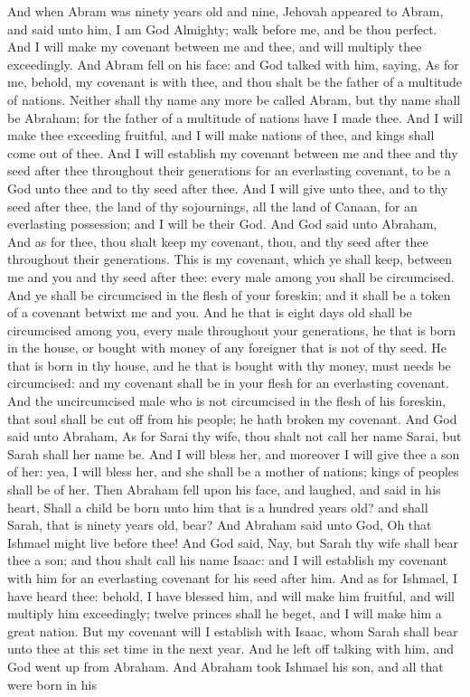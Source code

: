 And when Abram was ninety years old and nine, Jehovah appeared to Abram, and said unto him, I am God Almighty; walk before me, and be thou perfect. And I will make my covenant between me and thee, and will multiply thee exceedingly. And Abram fell on his face: and God talked with him, saying, As for me, behold, my covenant is with thee, and thou shalt be the father of a multitude of nations. Neither shall thy name any more be called Abram, but thy name shall be Abraham; for the father of a multitude of nations have I made thee. And I will make thee exceeding fruitful, and I will make nations of thee, and kings shall come out of thee. And I will establish my covenant between me and thee and thy seed after thee throughout their generations for an everlasting covenant, to be a God unto thee and to thy seed after thee. And I will give unto thee, and to thy seed after thee, the land of thy sojournings, all the land of Canaan, for an everlasting possession; and I will be their God.  And God said unto Abraham, And as for thee, thou shalt keep my covenant, thou, and thy seed after thee throughout their generations. This is my covenant, which ye shall keep, between me and you and thy seed after thee: every male among you shall be circumcised. And ye shall be circumcised in the flesh of your foreskin; and it shall be a token of a covenant betwixt me and you. And he that is eight days old shall be circumcised among you, every male throughout your generations, he that is born in the house, or bought with money of any foreigner that is not of thy seed. He that is born in thy house, and he that is bought with thy money, must needs be circumcised: and my covenant shall be in your flesh for an everlasting covenant. And the uncircumcised male who is not circumcised in the flesh of his foreskin, that soul shall be cut off from his people; he hath broken my covenant.  And God said unto Abraham, As for Sarai thy wife, thou shalt not call her name Sarai, but Sarah shall her name be. And I will bless her, and moreover I will give thee a son of her: yea, I will bless her, and she shall be a mother of nations; kings of peoples shall be of her. Then Abraham fell upon his face, and laughed, and said in his heart, Shall a child be born unto him that is a hundred years old? and shall Sarah, that is ninety years old, bear? And Abraham said unto God, Oh that Ishmael might live before thee! And God said, Nay, but Sarah thy wife shall bear thee a son; and thou shalt call his name Isaac: and I will establish my covenant with him for an everlasting covenant for his seed after him. And as for Ishmael, I have heard thee: behold, I have blessed him, and will make him fruitful, and will multiply him exceedingly; twelve princes shall he beget, and I will make him a great nation. But my covenant will I establish with Isaac, whom Sarah shall bear unto thee at this set time in the next year.  And he left off talking with him, and God went up from Abraham. And Abraham took Ishmael his son, and all that were born in his 